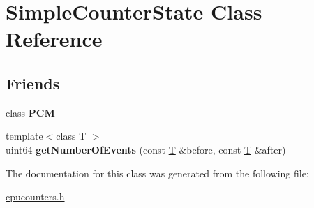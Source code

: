 \hypertarget{class_simple_counter_state}{}\section{Simple\+Counter\+State Class Reference}
\label{class_simple_counter_state}
\subsection*{Friends}
\begin{DoxyCompactItemize}
\item 
\mbox{\label{class_simple_counter_state_ab5f56d2e95ba3daf52c17b8a1d356d64}} 
class {\bfseries P\+CM}
\item 
\mbox{\label{class_simple_counter_state_a1eaf6125d8827e066565b4958a3725c9}} 
{\footnotesize template$<$class T $>$ }\\uint64 {\bfseries get\+Number\+Of\+Events} (const \mbox{\hyperlink{struct_t}{T}} \&before, const \mbox{\hyperlink{struct_t}{T}} \&after)
\end{DoxyCompactItemize}


The documentation for this class was generated from the following file\+:\begin{DoxyCompactItemize}
\item 
\mbox{\hyperlink{cpucounters_8h}{cpucounters.\+h}}\end{DoxyCompactItemize}
